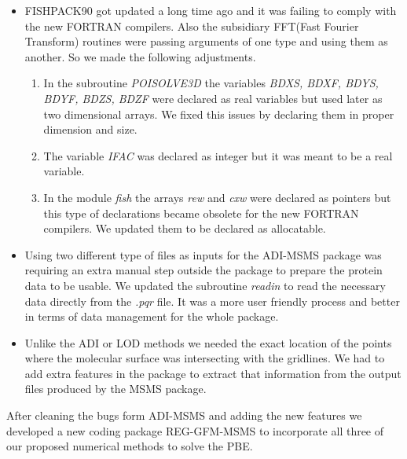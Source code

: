 \begin{itemize}
	\item FISHPACK90 got updated a long time ago and it was failing to comply with the new FORTRAN compilers. Also the subsidiary FFT(Fast Fourier Transform) routines were passing arguments of one type and using them as another. So we made the following adjustments.
		\begin{enumerate}
			\item In the subroutine {\it POISOLVE3D} the variables {\it BDXS, BDXF, BDYS, BDYF, BDZS, BDZF} were declared as real variables but used later as two dimensional arrays. We fixed this issues by declaring them in proper dimension and size.
			\item The variable {\it IFAC} was declared as integer but it was meant to be a real variable.
			\item In the module {\it fish} the arrays {\it rew} and {\it cxw} were declared as pointers but this type of declarations became obsolete for the new FORTRAN compilers. We updated them to be declared as allocatable.  
		\end{enumerate}
	\item Using two different type of files as inputs for the ADI-MSMS package was requiring an extra manual step outside the package to prepare the protein data to be usable. We updated the subroutine {\it readin} to read the necessary data directly from the {\it .pqr} file. It was a more user friendly process and better in terms of data management for the whole package.
	\item Unlike the ADI or LOD methods we needed the exact location of the points where the molecular surface was intersecting with the gridlines. We had to add extra features in the package to extract that information from the output files produced by the MSMS package.     
\end{itemize}  

After cleaning the bugs form ADI-MSMS and adding the new features we developed a new coding package REG-GFM-MSMS to incorporate all three of our proposed numerical methods to solve the PBE. 


